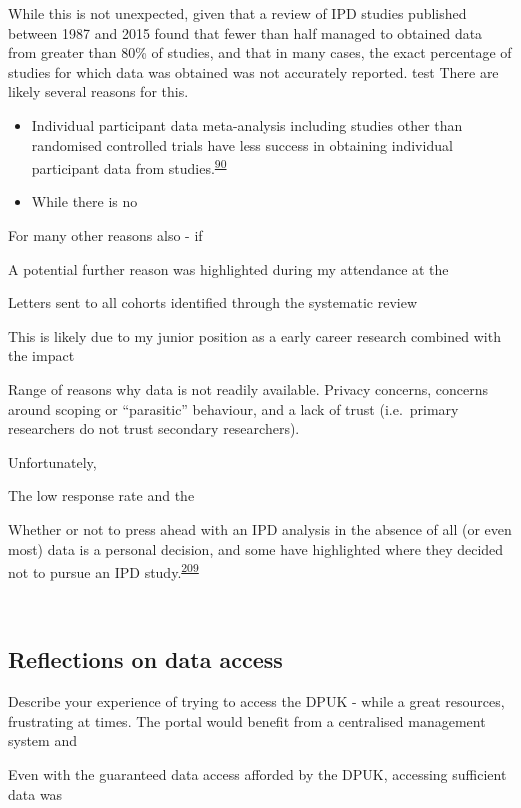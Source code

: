 \documentclass[a4paper, twoside]{templates/ociamthesis}
\begin{document}
While this is not unexpected, given that a review of IPD studies published between 1987 and 2015 found that fewer than half managed to obtained data from greater than 80\% of studies, and that in many cases, the exact percentage of studies for which data was obtained was not accurately reported.
test
There are likely several reasons for this.

\begin{itemize}
\item
  Individual participant data meta-analysis including studies other than randomised controlled trials have less success in obtaining individual participant data from studies.\textsuperscript{\protect\hyperlink{ref-nevitt2017a}{90}}
\item
  While there is no
\end{itemize}

For many other reasons also - if

A potential further reason was highlighted during my attendance at the

Letters sent to all cohorts identified through the systematic review

This is likely due to my junior position as a early career research combined with the impact

Range of reasons why data is not readily available. Privacy concerns, concerns around scoping or ``parasitic'' behaviour, and a lack of trust (i.e.~primary researchers do not trust secondary researchers).

Unfortunately,

The low response rate and the

Whether or not to press ahead with an IPD analysis in the absence of all (or even most) data is a personal decision, and some have highlighted where they decided not to pursue an IPD study.\textsuperscript{\protect\hyperlink{ref-jaspers2014}{209}}

~

\hypertarget{reflections-on-data-access}{%
\subsection{Reflections on data access}\label{reflections-on-data-access}}

Describe your experience of trying to access the DPUK - while a great resources, frustrating at times. The portal would benefit from a centralised management system and

Even with the guaranteed data access afforded by the DPUK, accessing sufficient data was
\end{document}
